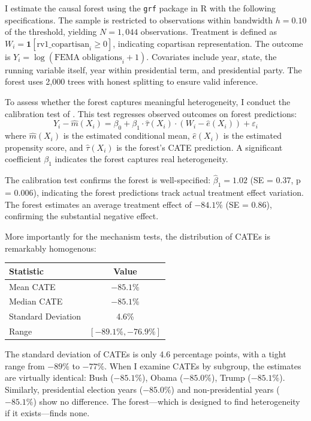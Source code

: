 \documentclass[12pt,letterpaper,oneside]{book}
\begin{document}
I estimate the causal forest using the \texttt{grf} package in R with the following specifications. The sample is restricted to observations within bandwidth $h = 0.10$ of the threshold, yielding $N = 1{,}044$ observations. Treatment is defined as $W_i = \mathbf{1}[\text{rv1\_copartisan}_i \geq 0]$, indicating copartisan representation. The outcome is $Y_i = \log(\text{FEMA obligations}_i + 1)$. Covariates include year, state, the running variable itself, year within presidential term, and presidential party. The forest uses 2,000 trees with honest splitting to ensure valid inference.

To assess whether the forest captures meaningful heterogeneity, I conduct the calibration test of \cite{chernozhukov2018generic}. This test regresses observed outcomes on forest predictions:
\begin{equation}
Y_i - \hat{m}(X_i) = \beta_0 + \beta_1 \cdot \hat{\tau}(X_i) \cdot (W_i - \hat{e}(X_i)) + \varepsilon_i
\end{equation}
where $\hat{m}(X_i)$ is the estimated conditional mean, $\hat{e}(X_i)$ is the estimated propensity score, and $\hat{\tau}(X_i)$ is the forest's CATE prediction. A significant coefficient $\beta_1$ indicates the forest captures real heterogeneity.

The calibration test confirms the forest is well-specified: $\hat{\beta}_1 = 1.02$ (SE = 0.37, p = 0.006), indicating the forest predictions track actual treatment effect variation. The forest estimates an average treatment effect of $-84.1\%$ (SE = 0.86), confirming the substantial negative effect.

More importantly for the mechanism tests, the distribution of CATEs is remarkably homogenous:

\begin{center}
\begin{tabular}{lc}
\toprule
Statistic & Value \\
\midrule
Mean CATE & $-85.1\%$ \\
Median CATE & $-85.1\%$ \\
Standard Deviation & 4.6\% \\
Range & $[-89.1\%, -76.9\%]$ \\
\bottomrule
\end{tabular}
\end{center}

The standard deviation of CATEs is only 4.6 percentage points, with a tight range from $-89\%$ to $-77\%$. When I examine CATEs by subgroup, the estimates are virtually identical: Bush ($-85.1\%$), Obama ($-85.0\%$), Trump ($-85.1\%$). Similarly, presidential election years ($-85.0\%$) and non-presidential years ($-85.1\%$) show no difference. The forest---which is designed to find heterogeneity if it exists---finds none.
\end{document}

